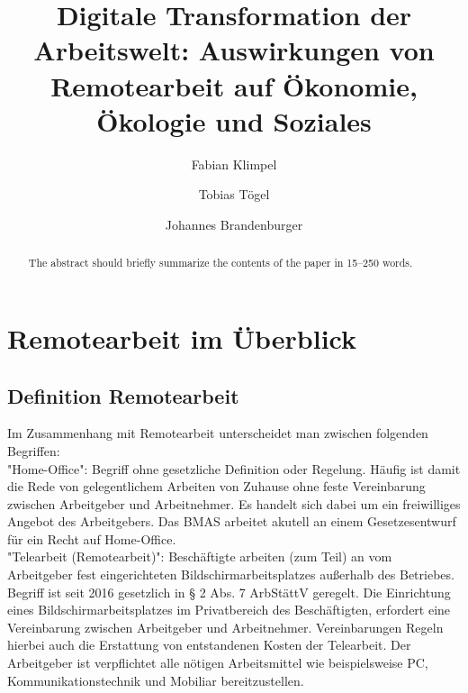 \documentclass[runningheads]{llncs}
\begin{document}
\title{Digitale Transformation der Arbeitswelt: Auswirkungen von Remotearbeit auf Ökonomie, Ökologie und Soziales}


\author{Fabian Klimpel\orcidID{} \and
Tobias Tögel\orcidID{} \and
Johannes Brandenburger\orcidID{}}
%


\maketitle

\begin{abstract}
The abstract should briefly summarize the contents of the paper in
15--250 words.


\end{abstract}


\section{Remotearbeit im Überblick}

\subsection{Definition Remotearbeit}

Im Zusammenhang mit Remotearbeit unterscheidet man zwischen folgenden Begriffen:\\ 

"Home-Office": Begriff ohne gesetzliche Definition oder Regelung. Häufig ist damit die Rede von gelegentlichem Arbeiten von Zuhause ohne feste Vereinbarung zwischen Arbeitgeber und Arbeitnehmer\cite{Lenz}. Es handelt sich dabei um ein freiwilliges Angebot des Arbeitgebers\cite{Lenz}. Das BMAS arbeitet akutell an einem Gesetzesentwurf für ein Recht auf Home-Office\cite{Lenz}.\\ 

"Telearbeit (Remotearbeit)": Beschäftigte arbeiten (zum Teil) an vom Arbeitgeber fest eingerichteten Bildschirmarbeitsplatzes außerhalb des Betriebes. Begriff ist seit 2016 gesetzlich in § 2 Abs. 7 ArbStättV geregelt\cite{bundestag}. Die Einrichtung eines Bildschirmarbeitsplatzes im Privatbereich des Beschäftigten, erfordert eine Vereinbarung zwischen Arbeitgeber und Arbeitnehmer\cite{vbg}. Vereinbarungen Regeln hierbei auch die Erstattung von entstandenen Kosten der Telearbeit\cite{vbg}. Der Arbeitgeber ist verpflichtet alle nötigen Arbeitsmittel wie beispielsweise PC, Kommunikationstechnik und Mobiliar bereitzustellen\cite{vbg}.\\    
\end{document}

